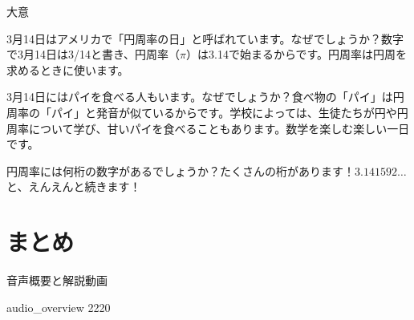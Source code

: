 \documentclass[aspectratio=169,xcolor={dvipsnames,table}]{beamer}
\begin{document}
\begin{frame}[plain]{大意}

3月14日はアメリカで「円周率の日」と呼ばれています。なぜでしょうか？数字で3月14日は3/14と書き、円周率（$\pi$）は3.14で始まるからです。円周率は円周を求めるときに使います。

3月14日にはパイを食べる人もいます。なぜでしょうか？食べ物の「パイ」は円周率の「パイ」と発音が似ているからです。学校によっては、生徒たちが円や円周率について学び、甘いパイを食べることもあります。数学を楽しむ楽しい一日です。

円周率には何桁の数字があるでしょうか？たくさんの桁があります！$3.141592 \ldots$と、えんえんと続きます！
\end{frame}
\section{まとめ}
\begin{frame}[plain]{音声概要と解説動画}
 
{\tiny audio\_overview 2220}\,{\scriptsize {}}
\end{frame}
\end{document}
